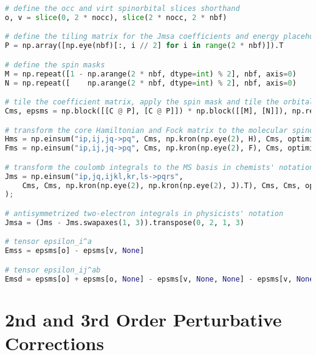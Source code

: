 \raggedbottom\begin{lstlisting}[language=Python, caption={Integral transform exercise code solution.}, label=code:int_solution]
# define the occ and virt spinorbital slices shorthand
o, v = slice(0, 2 * nocc), slice(2 * nocc, 2 * nbf)

# define the tiling matrix for the Jmsa coefficients and energy placeholders
P = np.array([np.eye(nbf)[:, i // 2] for i in range(2 * nbf)]).T

# define the spin masks
M = np.repeat([1 - np.arange(2 * nbf, dtype=int) % 2], nbf, axis=0)
N = np.repeat([    np.arange(2 * nbf, dtype=int) % 2], nbf, axis=0)

# tile the coefficient matrix, apply the spin mask and tile the orbital energies
Cms, epsms = np.block([[C @ P], [C @ P]]) * np.block([[M], [N]]), np.repeat(eps, 2)

# transform the core Hamiltonian and Fock matrix to the molecular spinorbital basis
Hms = np.einsum("ip,ij,jq->pq", Cms, np.kron(np.eye(2), H), Cms, optimize=True)
Fms = np.einsum("ip,ij,jq->pq", Cms, np.kron(np.eye(2), F), Cms, optimize=True)

# transform the coulomb integrals to the MS basis in chemists' notation
Jms = np.einsum("ip,jq,ijkl,kr,ls->pqrs",
    Cms, Cms, np.kron(np.eye(2), np.kron(np.eye(2), J).T), Cms, Cms, optimize=True
);

# antisymmetrized two-electron integrals in physicists' notation
Jmsa = (Jms - Jms.swapaxes(1, 3)).transpose(0, 2, 1, 3)

# tensor epsilon_i^a
Emss = epsms[o] - epsms[v, None]

# tensor epsilon_ij^ab
Emsd = epsms[o] + epsms[o, None] - epsms[v, None, None] - epsms[v, None, None, None]
\end{lstlisting}

\section*{\texorpdfstring{2nd and 3rd Order Perturbative Corrections\label{sec:mp_code_solution}}{2nd and 3rd Order Perturbative Corrections}}

